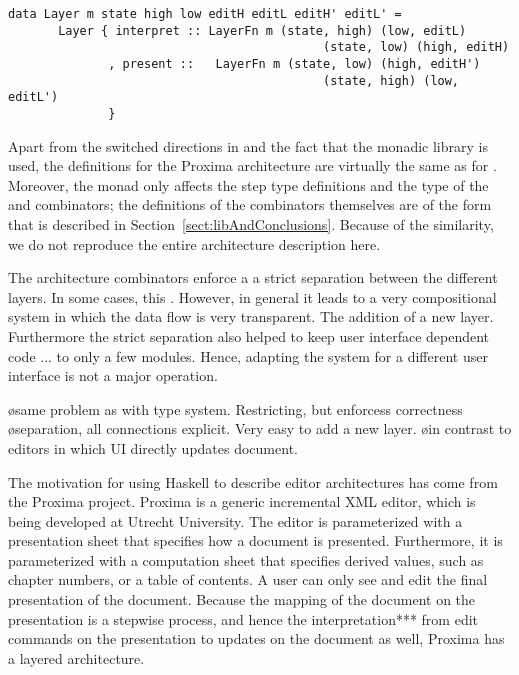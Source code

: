 \documentclass[preprint,natbib]{sigplanconf}
\begin{document}
\begin{small}
\begin{verbatim}
data Layer m state high low editH editL editH' editL' =
       Layer { interpret :: LayerFn m (state, high) (low, editL)
                                            (state, low) (high, editH)
              , present ::   LayerFn m (state, low) (high, editH')
                                            (state, high) (low, editL')
              }
\end{verbatim}
\end{small}

Apart from the switched directions in  and the fact that the monadic library is used, the definitions for the Proxima architecture are virtually the same as for . Moreover, the monad only affects the step type definitions and the type of the  and  combinators; the definitions of the combinators themselves are of the form that is described in Section~\ref{sect:libAndConclusions}. Because of the similarity, we do not reproduce the entire architecture description here.

\bc
\bigskip

The architecture combinators enforce a a strict separation between the different layers. In some cases, this . However, in general it leads to a very compositional system in which the data flow is very transparent. The addition of a new layer. Furthermore the strict separation also helped to keep user interface dependent code ... to only a few modules. Hence, adapting the system for a different user interface is not a major operation.

\bl
\o same problem as with type system. Restricting, but enforcess correctness
\o separation, all connections explicit. Very easy to add a new layer. 
\o in contrast to editors in which UI directly updates document.
\el
\ec

\bc
The motivation for using Haskell to describe editor architectures has come from the Proxima project. Proxima is a generic incremental XML editor, which is being developed at Utrecht University. The editor is parameterized with a presentation sheet that specifies how a document is presented. Furthermore, it is parameterized with a computation sheet that specifies derived values, such as chapter numbers, or a table of contents. A user can only see and edit the final presentation of the document. Because the mapping of the document on the presentation is a stepwise process, and hence the interpretation*** from edit commands on the presentation to updates on the document as well, Proxima has a layered architecture.
\ec
\end{document}
